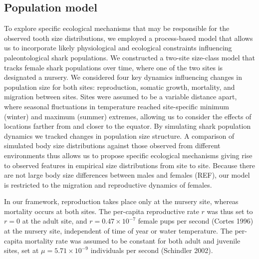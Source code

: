 \documentclass[]{rsos}%
\begin{document}
\subsection{Population model}

To explore specific ecological mechanisms that may be responsible for the observed tooth size distributions, we employed a process-based model that allows us to incorporate likely physiological and ecological constraints influencing paleontological shark populations.
We constructed a two-site size-class model that tracks female shark populations over time, where one of the two sites is designated a nursery.
We considered four key dynamics influencing changes in population size for both sites: reproduction, somatic growth, mortality, and migration between sites.
Sites were assumed to be a variable distance apart, where seasonal fluctuations in temperature reached site-specific minimum (winter) and maximum (summer) extremes, allowing us to consider the effects of locations farther from and closer to the equator.
By simulating shark population dynamics we tracked changes in population size structure. 
A comparison of simulated body size distributions against those observed from different environments thus allows us to propose specific ecological mechanisms giving rise to observed features in empirical size distributions from site to site.
Because there are not large body size differences between males and females (REF), our model is restricted to the migration and reproductive dynamics of females.

In our framework, reproduction takes place only at the nursery site, whereas mortality occurs at both sites.
The per-capita reproductive rate $r$ was thus set to $r=0$ at the adult site, and $r = 0.47 \times 10^{-7}$ female pups per second (Cortes 1996) at the nursery site, independent of time of year or water temperature. 
The per-capita mortality rate was assumed to be constant for both adult and juvenile sites, set at $\mu = 5.71 \times 10^{-9}$ individuals per second (Schindler 2002).
\end{document}
